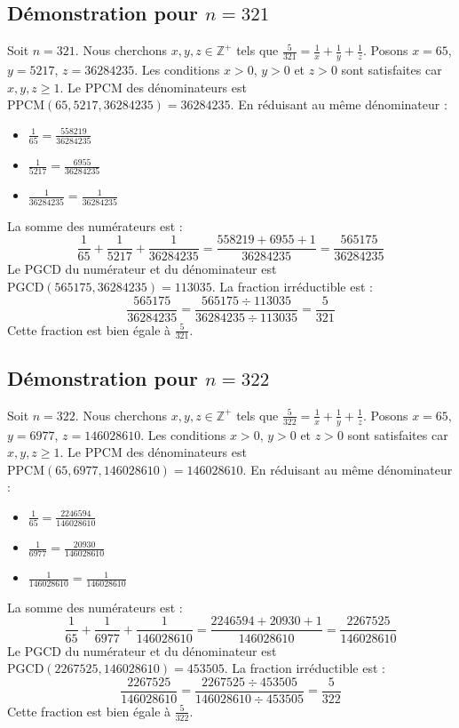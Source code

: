 \documentclass[11pt,a4paper]{article}
\begin{document}
\subsection{Démonstration pour $n = 321$}
Soit $n = 321$. Nous cherchons $x, y, z \in \mathbb{Z}^{+}$ tels que $\frac{5}{321} = \frac{1}{x} + \frac{1}{y} + \frac{1}{z}$.
Posons $x = 65$, $y = 5217$, $z = 36284235$.
Les conditions $x > 0$, $y > 0$ et $z > 0$ sont satisfaites car $x, y, z \geq 1$.
Le PPCM des dénominateurs est $\text{PPCM}(65, 5217, 36284235) = 36284235$.
En réduisant au même dénominateur :
\begin{itemize}
    \item $\frac{1}{65} = \frac{558219}{36284235}$
    \item $\frac{1}{5217} = \frac{6955}{36284235}$
    \item $\frac{1}{36284235} = \frac{1}{36284235}$
\end{itemize}
La somme des numérateurs est :
$$ \frac{1}{65} + \frac{1}{5217} + \frac{1}{36284235} = \frac{558219 + 6955 + 1}{36284235} = \frac{565175}{36284235} $$
Le PGCD du numérateur et du dénominateur est $\text{PGCD}(565175, 36284235) = 113035$.
La fraction irréductible est :
$$ \frac{565175}{36284235} = \frac{565175 \div 113035}{36284235 \div 113035} = \frac{5}{321} $$
Cette fraction est bien égale à $\frac{5}{321}$.

\subsection{Démonstration pour $n = 322$}
Soit $n = 322$. Nous cherchons $x, y, z \in \mathbb{Z}^{+}$ tels que $\frac{5}{322} = \frac{1}{x} + \frac{1}{y} + \frac{1}{z}$.
Posons $x = 65$, $y = 6977$, $z = 146028610$.
Les conditions $x > 0$, $y > 0$ et $z > 0$ sont satisfaites car $x, y, z \geq 1$.
Le PPCM des dénominateurs est $\text{PPCM}(65, 6977, 146028610) = 146028610$.
En réduisant au même dénominateur :
\begin{itemize}
    \item $\frac{1}{65} = \frac{2246594}{146028610}$
    \item $\frac{1}{6977} = \frac{20930}{146028610}$
    \item $\frac{1}{146028610} = \frac{1}{146028610}$
\end{itemize}
La somme des numérateurs est :
$$ \frac{1}{65} + \frac{1}{6977} + \frac{1}{146028610} = \frac{2246594 + 20930 + 1}{146028610} = \frac{2267525}{146028610} $$
Le PGCD du numérateur et du dénominateur est $\text{PGCD}(2267525, 146028610) = 453505$.
La fraction irréductible est :
$$ \frac{2267525}{146028610} = \frac{2267525 \div 453505}{146028610 \div 453505} = \frac{5}{322} $$
Cette fraction est bien égale à $\frac{5}{322}$.
\end{document}
